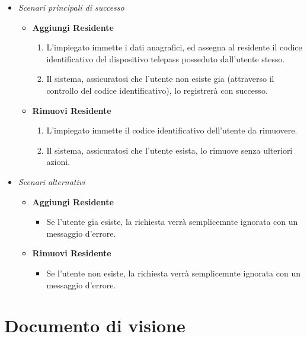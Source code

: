 \documentclass[12pt, letterpaper]{article}
\begin{document}
\begin{itemize}
    \item \emph{Scenari principali di successo}
    \begin{itemize}
        \item \textbf{Aggiungi Residente}
        \begin{enumerate}
            \item L'impiegato immette i dati anagrafici, ed assegna al residente il codice identificativo del dispositivo telepass posseduto dall'utente stesso.
            \item Il sistema, assicuratosi che l'utente non esiste gia (attraverso il controllo del codice identificativo), lo registrerà con successo.
        \end{enumerate}

        \item \textbf{Rimuovi Residente}
        \begin{enumerate}
            \item L'impiegato immette il codice identificativo dell'utente da rimuovere.
            \item Il sistema, assicuratosi che l'utente esista, lo rimuove senza ulteriori azioni.
        \end{enumerate}
    \end{itemize}

    \item \emph{Scenari alternativi}
    \begin{itemize}
        \item \textbf{Aggiungi Residente}
        \begin{itemize}
            \item Se l'utente gia esiste, la richiesta verrà semplicemnte ignorata con un messaggio d'errore.
        \end{itemize}

        \item \textbf{Rimuovi Residente}
        \begin{itemize}
            \item Se l'utente non esiste, la richiesta verrà semplicemnte ignorata con un messaggio d'errore.
        \end{itemize}
    \end{itemize}

\end{itemize}



\section{Documento di visione}
\end{document}
